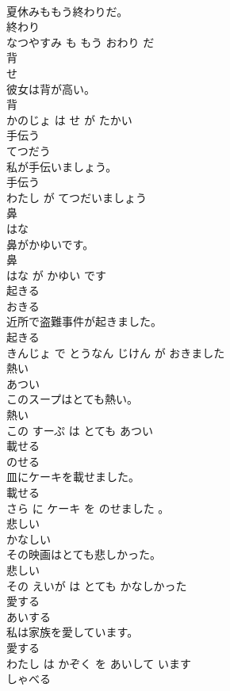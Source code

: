 \documentclass[8pt]{extreport}
\begin{document}
\begin{CJK}{UTF8}{min}
\\	夏休みももう終わりだ。	
\\	終わり 
\\	なつやすみ も もう おわり だ			
\\	背	
\\	せ			
\\	彼女は背が高い。	
\\	背 
\\	かのじょ は せ が たかい			
\\	手伝う	
\\	てつだう			
\\	私が手伝いましょう。	
\\	手伝う 
\\	わたし が てつだいましょう			
\\	鼻	
\\	はな			
\\	鼻がかゆいです。	
\\	鼻 
\\	はな が かゆい です			
\\	起きる	
\\	おきる			
\\	近所で盗難事件が起きました。	
\\	起きる 
\\	きんじょ で とうなん じけん が おきました			
\\	熱い	
\\	あつい			
\\	このスープはとても熱い。	
\\	熱い 
\\	この すーぷ は とても あつい			
\\	載せる	
\\	のせる			
\\	皿にケーキを載せました。	
\\	載せる 
\\	さら に ケーキ を のせました 。			
\\	悲しい	
\\	かなしい			
\\	その映画はとても悲しかった。	
\\	悲しい 
\\	その えいが は とても かなしかった			
\\	愛する	
\\	あいする			
\\	私は家族を愛しています。	
\\	愛する 
\\	わたし は かぞく を あいして います			
\\	しゃべる	

\end{CJK}
\end{document}
